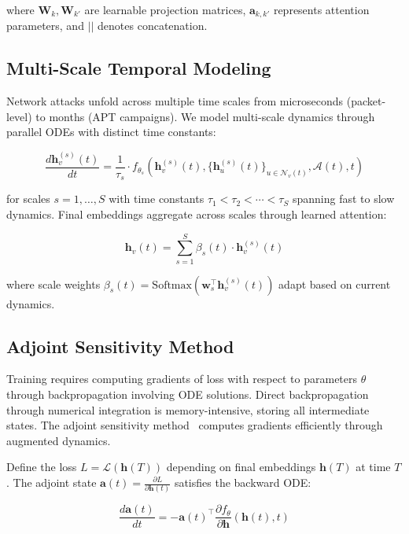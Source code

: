 where $\mathbf{W}_k, \mathbf{W}_{k'}$ are learnable projection matrices, $\mathbf{a}_{k,k'}$ represents attention parameters, and $||$ denotes concatenation.

\subsection{Multi-Scale Temporal Modeling}

Network attacks unfold across multiple time scales from microseconds (packet-level) to months (APT campaigns). We model multi-scale dynamics through parallel ODEs with distinct time constants:

\begin{equation}
\frac{d\mathbf{h}_v^{(s)}(t)}{dt} = \frac{1}{\tau_s} \cdot f_{\theta_s}(\mathbf{h}_v^{(s)}(t), \{\mathbf{h}_u^{(s)}(t)\}_{u \in \mathcal{N}_v(t)}, \mathcal{A}(t), t)
\end{equation}

for scales $s = 1, \ldots, S$ with time constants $\tau_1 < \tau_2 < \cdots < \tau_S$ spanning fast to slow dynamics. Final embeddings aggregate across scales through learned attention:

\begin{equation}
\mathbf{h}_v(t) = \sum_{s=1}^S \beta_s(t) \cdot \mathbf{h}_v^{(s)}(t)
\end{equation}

where scale weights $\beta_s(t) = \text{Softmax}(\mathbf{w}_s^\top \mathbf{h}_v^{(s)}(t))$ adapt based on current dynamics.

\subsection{Adjoint Sensitivity Method}

Training requires computing gradients of loss with respect to parameters $\theta$ through backpropagation involving ODE solutions. Direct backpropagation through numerical integration is memory-intensive, storing all intermediate states. The adjoint sensitivity method~\cite{pontryagin1962mathematical,chen2018neural} computes gradients efficiently through augmented dynamics.

Define the loss $L = \mathcal{L}(\mathbf{h}(T))$ depending on final embeddings $\mathbf{h}(T)$ at time $T$. The adjoint state $\mathbf{a}(t) = \frac{\partial L}{\partial \mathbf{h}(t)}$ satisfies the backward ODE:

\begin{equation}
\frac{d\mathbf{a}(t)}{dt} = -\mathbf{a}(t)^\top \frac{\partial f_\theta}{\partial \mathbf{h}}(\mathbf{h}(t), t)
\end{equation}

